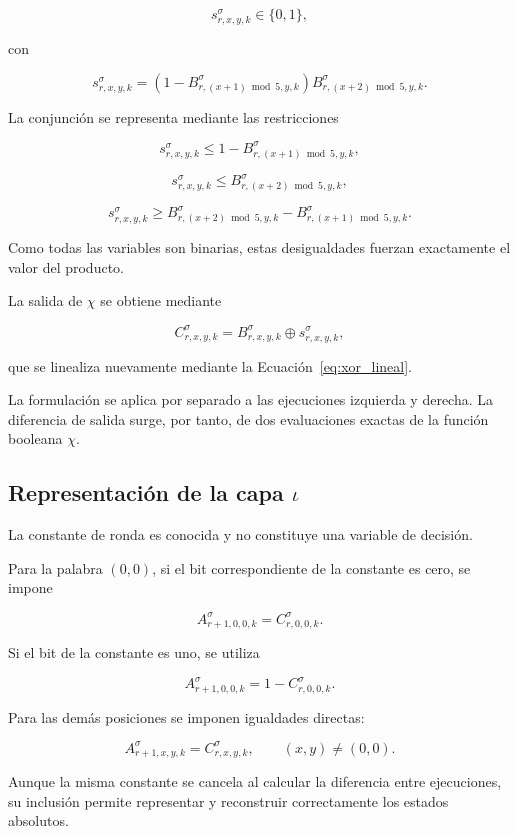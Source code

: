 \[
s_{r,x,y,k}^{\sigma} \in \{0,1\},
\]

con

\[
s_{r,x,y,k}^{\sigma}
=
\left(
1-B_{r,(x+1)\bmod 5,y,k}^{\sigma}
\right)
B_{r,(x+2)\bmod 5,y,k}^{\sigma}.
\]

La conjunción se representa mediante las restricciones

\[
s_{r,x,y,k}^{\sigma}
\leq
1-B_{r,(x+1)\bmod 5,y,k}^{\sigma},
\]

\[
s_{r,x,y,k}^{\sigma}
\leq
B_{r,(x+2)\bmod 5,y,k}^{\sigma},
\]

\[
s_{r,x,y,k}^{\sigma}
\geq
B_{r,(x+2)\bmod 5,y,k}^{\sigma}
-
B_{r,(x+1)\bmod 5,y,k}^{\sigma}.
\]

Como todas las variables son binarias, estas desigualdades fuerzan
exactamente el valor del producto.

La salida de $\chi$ se obtiene mediante

\[
C_{r,x,y,k}^{\sigma}
=
B_{r,x,y,k}^{\sigma}
\oplus
s_{r,x,y,k}^{\sigma},
\]

que se linealiza nuevamente mediante la
Ecuación~\ref{eq:xor_lineal}.

La formulación se aplica por separado a las ejecuciones izquierda y
derecha. La diferencia de salida surge, por tanto, de dos evaluaciones
exactas de la función booleana $\chi$.


\subsection{Representación de la capa \texorpdfstring{$\iota$}{iota}}
\label{subsec:iota_milp}

La constante de ronda es conocida y no constituye una variable de decisión.

Para la palabra $(0,0)$, si el bit correspondiente de la constante es cero,
se impone

\[
A_{r+1,0,0,k}^{\sigma}
=
C_{r,0,0,k}^{\sigma}.
\]

Si el bit de la constante es uno, se utiliza

\[
A_{r+1,0,0,k}^{\sigma}
=
1-C_{r,0,0,k}^{\sigma}.
\]

Para las demás posiciones se imponen igualdades directas:

\[
A_{r+1,x,y,k}^{\sigma}
=
C_{r,x,y,k}^{\sigma},
\qquad
(x,y)\neq(0,0).
\]

Aunque la misma constante se cancela al calcular la diferencia entre
ejecuciones, su inclusión permite representar y reconstruir correctamente
los estados absolutos.


